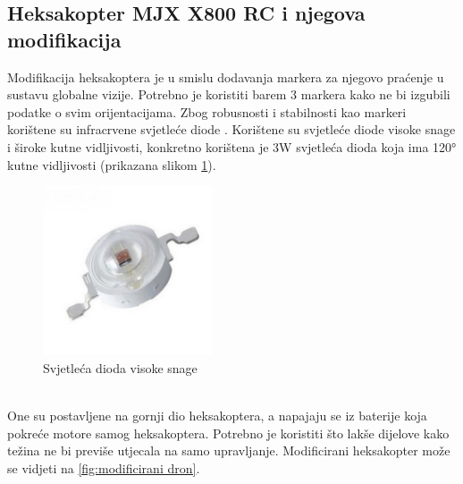 \documentclass[times, utf8, diplomski]{fer}
\begin{document}
\subsection{Heksakopter MJX X800 RC i njegova modifikacija}\label{sec:heksakopter}
Modifikacija heksakoptera je u smislu dodavanja markera za njegovo praćenje u sustavu globalne vizije. Potrebno je koristiti barem 3 markera kako ne bi izgubili podatke o svim orijentacijama. Zbog robusnosti i stabilnosti kao markeri korištene su infracrvene  svjetleće diode . Korištene su svjetleće diode visoke snage i široke kutne vidljivosti, konkretno korištena je 3W svjetleća dioda koja ima \ang{120} kutne vidljivosti (prikazana slikom \ref{fig:LED}). \\
\begin{figure}[htb]
\centering
\includegraphics[width=5cm]{img/LED.png}
\caption{Svjetleća dioda visoke snage\protect\footnotemark}
\label{fig:LED}
\end{figure}\\
One su postavljene na gornji dio heksakoptera, a napajaju se iz baterije koja pokreće motore samog heksakoptera. Potrebno je koristiti što lakše dijelove kako težina ne bi previše utjecala na samo upravljanje. Modificirani heksakopter može se vidjeti na \ref{fig:modificirani dron}.
\end{document}
